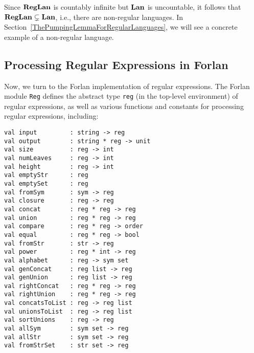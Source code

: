 Since $\mathbf{RegLan}$ is countably infinite but $\mathbf{Lan}$ is uncountable, it
follows that $\mathbf{RegLan}\subsetneq\mathbf{Lan}$, i.e., there are non-regular
languages.
In Section~\ref{ThePumpingLemmaForRegularLanguages}, we will see a concrete
example of a non-regular language.

\subsection{Processing Regular Expressions in Forlan}

Now, we turn to the Forlan implementation of regular expressions.  The
Forlan module \texttt{Reg}
%
defines the abstract type \texttt{reg}
%
%
(in the top-level environment) of regular expressions, as well as various
functions and constants for processing regular expressions, including:
%
%
%
%
%
%
%
%
%
%
%
%
%
%
%
%
%
%
%
%
%
%
%
%
%
%
\begin{verbatim}
val input         : string -> reg
val output        : string * reg -> unit
val size          : reg -> int
val numLeaves     : reg -> int
val height        : reg -> int
val emptyStr      : reg
val emptySet      : reg
val fromSym       : sym -> reg
val closure       : reg -> reg
val concat        : reg * reg -> reg
val union         : reg * reg -> reg
val compare       : reg * reg -> order
val equal         : reg * reg -> bool
val fromStr       : str -> reg
val power         : reg * int -> reg
val alphabet      : reg -> sym set
val genConcat     : reg list -> reg
val genUnion      : reg list -> reg
val rightConcat   : reg * reg -> reg
val rightUnion    : reg * reg -> reg
val concatsToList : reg -> reg list
val unionsToList  : reg -> reg list
val sortUnions    : reg -> reg
val allSym        : sym set -> reg
val allStr        : sym set -> reg
val fromStrSet    : str set -> reg
\end{verbatim}

